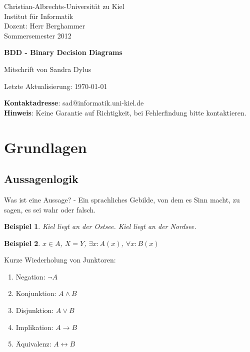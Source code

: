 \documentclass[ngerman]{scrartcl}
\theoremstyle{custom}
\newtheorem*{ex}{Beispiel}
\newcommand{\0}{\mathbf{0}}
\newcommand{\1}{\mathbf{L}}
\begin{document}
\begin{titlepage}
\thispagestyle{empty}
\begin{small}
\vfill {Christian-Albrechts-Universit\"at zu Kiel\\ 
Institut f\"ur Informatik \\ 
Dozent: Herr Berghammer\\
Sommersemester 2012}
\end{small}

\vspace{5cm}
\begin{center}
\begin{Large}
 {\textsf{\textbf{BDD - Binary Decision Diagrams
}}}
\end{Large}

\vspace{1cm}
Mitschrift von Sandra Dylus
\end{center}
\begin{small}
\begin{center}
Letzte Aktualisierung: \today
\end{center}
\end{small}
\vfill

\begin{small} 
\textbf{Kontaktadresse}: sad@informatik.uni-kiel.de\\
\textbf{Hinweis}: Keine Garantie auf Richtigkeit, bei Fehlerfindung bitte kontaktieren.
\end{small}

\end{titlepage}
\tableofcontents
\newpage

\section{Grundlagen}
\subsection{Aussagenlogik}
Was ist eine Aussage? - Ein sprachliches Gebilde, von dem es
Sinn macht, zu sagen, es sei wahr oder falsch.

\begin{ex} Kiel liegt an der Ostsee. Kiel liegt an der Nordsee.\end{ex}
\begin{ex} $x \in A$, $X=Y$, $\exists x: A(x)$, $\forall x :
  B(x)$\end{ex}

Kurze Wiederholung von Junktoren:
\begin{enumerate}
\item Negation: $\neg A$
\item Konjunktion: $A \wedge B$
\item Disjunktion: $A \vee B$
\item Implikation: $A \rightarrow B$
\item \"Aquivalenz: $A \leftrightarrow B$
\end{enumerate}
\end{document}
